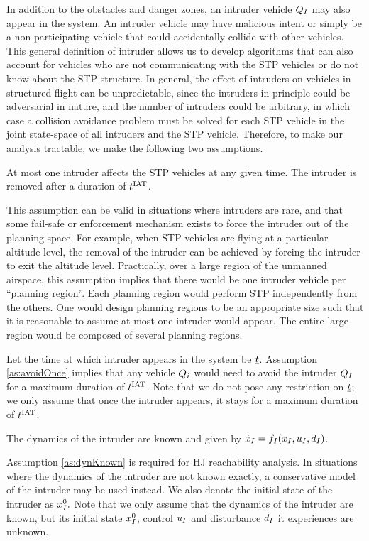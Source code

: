 In addition to the obstacles and danger zones, an intruder vehicle $Q_{I}$ may also appear in the system. An intruder vehicle may have malicious intent or simply be a non-participating vehicle that could accidentally collide with other vehicles. This general definition of intruder allows us to develop algorithms that can also account for vehicles who are not communicating with the STP vehicles or do not know about the STP structure. In general, the effect of intruders on vehicles in structured flight can be unpredictable, since the intruders in principle could be adversarial in nature, and the number of intruders could be arbitrary, in which case a collision avoidance problem must be solved for each STP vehicle in the joint state-space of all intruders and the STP vehicle. Therefore, to make our analysis tractable, we make the following two assumptions.

\begin{assumption}
\label{as:avoidOnce}
At most one intruder affects the STP vehicles at any given time. The intruder is removed after a duration of $t^\text{IAT}$. 
\end{assumption}

This assumption can be valid in situations where intruders are rare, and that some fail-safe or enforcement mechanism exists to force the intruder out of the planning space. For example, when STP vehicles are flying at a particular altitude level, the removal of the intruder can be achieved by forcing the intruder to exit the altitude level. Practically, over a large region of the unmanned airspace, this assumption implies that there would be one intruder vehicle per ``planning region''. Each planning region would perform STP independently from the others. One would design planning regions to be an appropriate size such that it is reasonable to assume at most one intruder would appear. The entire large region would be composed of several planning regions.
 
Let the time at which intruder appears in the system be $\underline{t}$. Assumption \ref{as:avoidOnce} implies that any vehicle $Q_i$ would need to avoid the intruder $Q_{I}$ for a maximum duration of $t^\text{IAT}$.
Note that we do not pose any restriction on $\underline{t}$; we only assume that once the intruder appears, it stays for a maximum duration of $t^\text{IAT}$.
\begin{assumption}
\label{as:dynKnown}
The dynamics of the intruder are known and given by $\dot{x}_I = f_I(x_I, u_I, d_I)$.
\end{assumption}
Assumption \ref{as:dynKnown} is required for HJ reachability analysis. In situations where the dynamics of the intruder are not known exactly, a conservative model of the intruder may be used instead. We also denote the initial state of the intruder as $x_{I}^0.$ Note that we only assume that the dynamics of the intruder are known, but its initial state $x_{I}^0$, control $u_I$ and disturbance $d_I$ it experiences are unknown.

